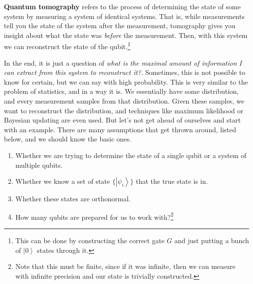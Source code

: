 \documentclass{article}
\newcommand{\ket}[1]{\ensuremath{\left|#1\right\rangle}}
\begin{document}
    \begin{definition}
      \textbf{Quantum tomography} refers to the process of determining the state of some system by measuring a system of identical systems. That is, while measurements tell you the state of the system after the measurement, tomography gives you insight about what the state was \textit{before} the measurement. Then, with this system we can reconstruct the state of the qubit.\footnote{This can be done by constructing the correct gate $G$ and just putting a bunch of $\ket{0}$ states through it.}
    \end{definition}

    In the end, it is just a question of \textit{what is the maximal amount of information I can extract from this system to reconstruct it?}. Sometimes, this is not possible to know for certain, but we can say with high probability. This is very similar to the problem of statistics, and in a way it is. We essentially have some distribution, and every measurement samples from that distribution. Given these samples, we want to reconstruct the distribution, and techniques like maximum likelihood or Bayesian updating are even used. But let's not get ahead of ourselves and start with an example. There are many assumptions that get thrown around, listed below, and we should know the basic ones. 

    \begin{enumerate}
      \item Whether we are trying to determine the state of a single qubit or a system of multiple qubits. 
      \item Whether we know a set of state $\{\ket{\psi_i}\}$ that the true state is in. 
      \item Whether these states are orthonormal. 
      \item How many qubits are prepared for us to work with?\footnote{Note that this must be finite, since if it was infinite, then we can measure with infinite precision and our state is trivially constructed.}
    \end{enumerate}
\end{document}
